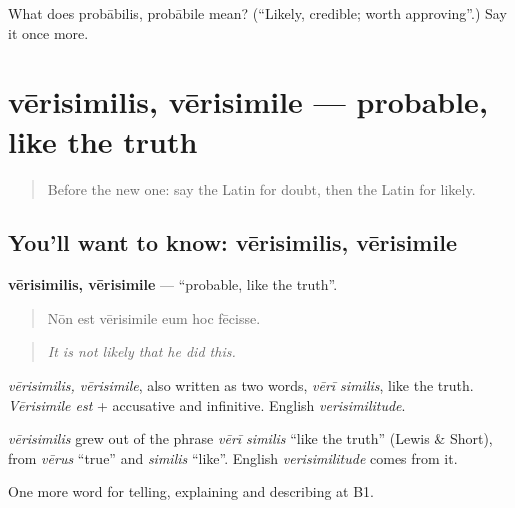 \begin{tcolorbox}[breakable,colback=teal!4,colframe=teal!35!black,title={Before you move on}]
What does probābilis, probābile mean? (\textquotedblleft{}Likely, credible; worth approving\textquotedblright{}.) Say it once more.
\end{tcolorbox}
\section[vērisimilis, vērisimile]{vērisimilis, vērisimile — probable, like the truth}

\label{lesson:LA-C359-verisimilis}



\begin{quote}
Before the new one: say the Latin for doubt, then the Latin for likely.
\end{quote}

\subsection*{You'll want to know: vērisimilis, vērisimile}
\textbf{vērisimilis, vērisimile} — \textquotedblleft{}probable, like the truth\textquotedblright{}.

\begin{quote}
Nōn est vērisimile eum hoc fēcisse.
\end{quote}

\begin{quote}
\emph{It is not likely that he did this.}
\end{quote}

\emph{vērisimilis, vērisimile}, also written as two words, \emph{vērī similis}, like the truth. \emph{Vērisimile est} + accusative and infinitive. English \emph{verisimilitude}.

\begin{cousinweb}
\emph{vērisimilis} grew out of the phrase \emph{vērī similis} \textquotedblleft{}like the truth\textquotedblright{} (Lewis \& Short), from \emph{vērus} \textquotedblleft{}true\textquotedblright{} and \emph{similis} \textquotedblleft{}like\textquotedblright{}. English \emph{verisimilitude} comes from it.
\end{cousinweb}

\begin{grammarlens}[title={What you've built}]
One more word for telling, explaining and describing at B1.
\end{grammarlens}

